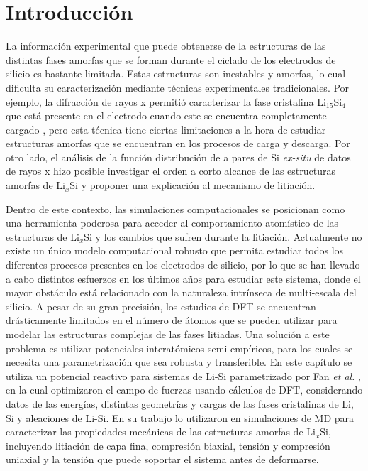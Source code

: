 \section{Introducción}

La información experimental que puede obtenerse de la estructuras de las 
distintas fases amorfas que se forman durante el ciclado de los electrodos de 
silicio es bastante limitada. Estas estructuras son 
inestables y amorfas, lo cual dificulta su caracterización mediante técnicas
experimentales tradicionales. Por ejemplo, la difracción de rayos x permitió
caracterizar la fase cristalina Li$_{15}$Si$_4$ que está presente en el electrodo
cuando este se encuentra completamente cargado \cite{obrovac2004}, pero esta 
técnica tiene ciertas limitaciones a la hora de estudiar estructuras amorfas 
que se encuentran en los procesos de carga y descarga. Por otro lado, el análisis
de la función distribución de a pares de Si \textit{ex-situ} de datos de rayos x
hizo posible investigar el orden a corto alcance de las estructuras amorfas de
Li$_x$Si \cite{key2011} y proponer una explicación al mecanismo de litiación.

Dentro de este contexto, las simulaciones computacionales se posicionan como una
herramienta poderosa para acceder al comportamiento atomístico de las 
estructuras de Li$_x$Si y los cambios que sufren durante la litiación. Actualmente
no existe un único modelo computacional robusto que permita estudiar todos los
diferentes procesos presentes en los electrodos de silicio, por lo que se han 
llevado a cabo distintos esfuerzos en los últimos años para estudiar este sistema,
donde el mayor obstáculo está relacionado con la naturaleza intrínseca de 
multi-escala del silicio. A pesar de su gran precisión, los estudios de DFT se
encuentran drásticamente limitados en el número de átomos que se pueden utilizar
para modelar las estructuras complejas de las fases litiadas. Una solución a este
problema es utilizar potenciales interatómicos semi-empíricos, para los cuales 
se necesita una parametrización que sea robusta y transferible. En este 
capítulo se utiliza un potencial reactivo
para sistemas de Li-Si parametrizado por Fan 
\textit{et al.} \cite{fan2013}, en la cual optimizaron el campo de fuerzas usando
cálculos de DFT, considerando datos de las energías, distintas geometrías y cargas
de las fases cristalinas de Li, Si y aleaciones de Li-Si. En su trabajo lo 
utilizaron en simulaciones de MD para caracterizar las propiedades mecánicas de
las estructuras amorfas de Li$_x$Si, incluyendo litiación de capa fina, compresión
biaxial, tensión y compresión uniaxial y la tensión que puede soportar el sistema 
antes de deformarse.
